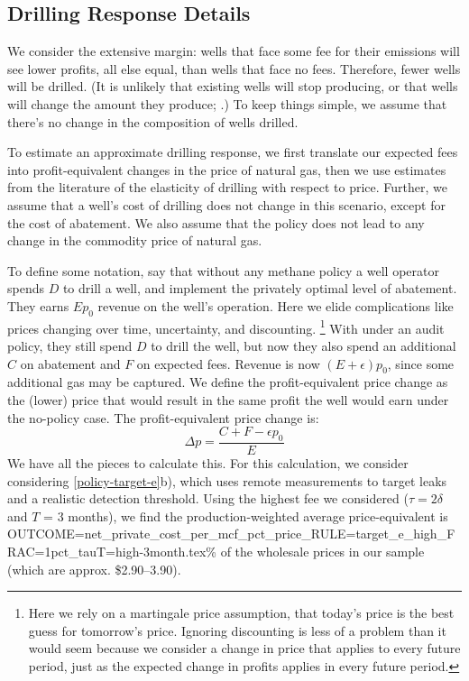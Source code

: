 \documentclass[12pt,oneside,letterpaper]{article}
\theoremstyle{definition}
\begin{document}
\begin{refsection}
\newpage
\section{Drilling Response Details}
\label{app:drilling-response-details}

We consider the extensive margin: wells that face some fee for their emissions will see lower profits, all else equal, than wells that face no fees.
Therefore, fewer wells will be drilled.
(It is unlikely that existing wells will stop producing, or that wells will change the amount they produce; \cite{Anderson/Kellogg/Salant:2018}.)
To keep things simple, we assume that there's no change in the composition of wells drilled.

To estimate an approximate drilling response, we first translate our expected fees into profit-equivalent changes in the price of natural gas, then we use estimates from the literature of the elasticity of drilling with respect to price.
Further, we assume that a well's cost of drilling does not change in this scenario, except for the cost of abatement.
We also assume that the policy does not lead to any change in the commodity price of natural gas.

To define some notation, say that without any methane policy a well operator spends $D$ to drill a well, and implement the privately optimal level of abatement.
They earns $E p_0$ revenue on the well's operation.
Here we elide complications like prices changing over time, uncertainty, and discounting.%
\footnote{%
Here we rely on a martingale price assumption, that today's price is the best guess for tomorrow's price.
Ignoring discounting is less of a problem than it would seem because we consider a change in price that applies to every future period, just as the expected change in profits applies in every future period.
}
With under an audit policy, they still spend $D$ to drill the well, but now they also spend an additional $C$ on abatement and $F$ on expected fees.
Revenue is now $(E + \epsilon) p_0$, since some additional gas may be captured.
We define the profit-equivalent price change as the (lower) price that would result in the same profit the well would earn under the no-policy case.
The profit-equivalent price change is:
\[
\Delta p = \frac{C + F - \epsilon p_0}{E}
\]
We have all the pieces to calculate this.
For this calculation, we consider considering \ref{policy-target-e}b), which uses remote measurements to target leaks and a realistic detection threshold.
Using the highest fee we considered ($\tau = 2\delta$ and $T$ = 3 months),
we find the production-weighted average price-equivalent is
{OUTCOME=net_private_cost_per_mcf_pct_price_RULE=target_e_high_FRAC=1pct_tauT=high-3month.tex}\%
of the wholesale prices in our sample (which are approx. \$2.90--3.90).


\end{refsection}
\end{document}
